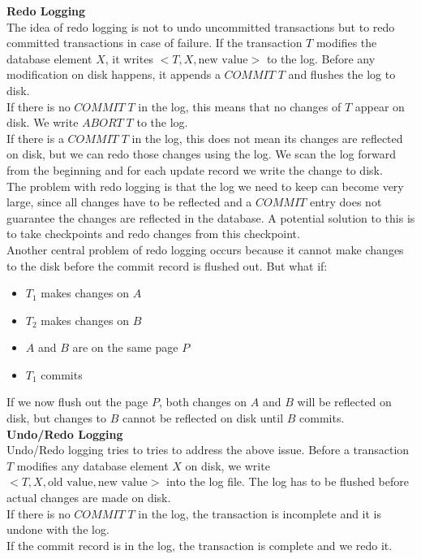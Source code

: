 \noindent\textbf{Redo Logging}\\
The idea of redo logging is not to undo uncommitted transactions but to redo committed transactions in case of failure. If the transaction $T$ modifies the database element $X$, it writes $<T, X, \text{new value}>$ to the log. Before any modification on disk happens, it appends a $COMMIT\;T$ and flushes the log to disk. \\
If there is no $COMMIT\;T$ in the log, this means that no changes of $T$ appear on disk. We write $ABORT\;T$ to the log.\\
If there is a $COMMIT\;T$ in the log, this does not mean its changes are reflected on disk, but we can redo those changes using the log. We scan the log forward from the beginning and for each update record we write the change to disk.\vspace{.2cm}\\
The problem with redo logging is that the log we need to keep can become very large, since all changes have to be reflected and a $COMMIT$ entry does not guarantee the changes are reflected in the database. A potential solution to this is to take checkpoints and redo changes from this checkpoint.\\
Another central problem of redo logging occurs because it cannot make changes to the disk before the commit record is flushed out. But what if:
\begin{itemize}
\item $T_1$ makes changes on $A$
\item $T_2$ makes changes on $B$
\item $A$ and $B$ are on the same page $P$
\item $T_1$ commits
\end{itemize}
If we now flush out the page $P$, both changes on $A$ and $B$ will be reflected on disk, but changes to $B$ cannot be reflected on disk until $B$ commits.\vspace{.3cm}\\

\noindent\textbf{Undo/Redo Logging}\\
Undo/Redo logging tries to tries to address the above issue. Before a transaction $T$ modifies any database element $X$ on disk, we write $<T, X, \text{old value}, \text{new value}>$ into the log file. The log has to be flushed before actual changes are made on disk.\\
If there is no $COMMIT\;T$ in the log, the transaction is incomplete and it is undone with the log.\\
If the commit record is in the log, the transaction is complete and we redo it.



